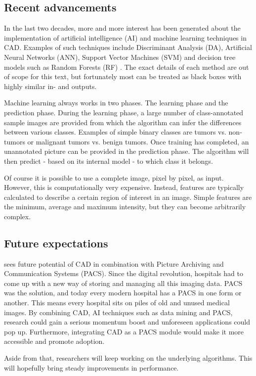 \subsection{Recent advancements}\label{ssec:cadadv}
In the last two decades, more and more interest has been generated about the
implementation of artificial intelligence (AI) and machine learning techniques
in CAD. Examples of such techniques include Discriminant Analysis (DA),
Artificial Neural Networks (ANN), Support Vector Machines (SVM) and decision
tree models such as Random Forests (RF) \cite{lungcadreview, ginneken}. The
exact details of each method are out of scope for this text, but fortunately
most can be treated as black boxes with highly similar in- and outputs. 

Machine learning always works in two phases. The learning phase and the
prediction phase. During the learning phase, a large number of class-annotated
sample images are provided from which the algorithm can infer the differences
between various classes. Examples of simple binary classes are tumors vs.
non-tumors or malignant tumors vs. benign tumors. Once training has completed,
an unannotated picture can be provided in the prediction phase. The algorithm
will then predict - based on its internal model - to which class it belongs.

Of course it is possible to use a complete image, pixel by pixel, as input.
However, this is computationally very expensive. Instead, features are typically
calculated to describe a certain region of interest in an image. Simple
features are the minimum, average and maximum intensity, but they can become
arbitrarily complex.

\subsection{Future expectations}
\cite{cadhistory} sees future potential of CAD in combination with Picture
Archiving and Communication Systems (PACS). Since the digital revolution,
hospitals had to come up with a new way of storing and managing all this imaging
data. PACS was the solution, and today every modern hospital has a PACS in one
form or another. This means every hospital sits on piles of old and unused
medical images. By combining CAD, AI techniques such as data mining and PACS,
research could gain a serious momentum boost and unforeseen applications could
pop up. Furthermore, integrating CAD as a PACS module would make it more
accessible and promote adoption.

Aside from that, researchers will keep working on the underlying algorithms.
This will hopefully bring steady improvements in performance.

